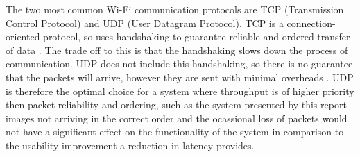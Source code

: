 The two most common Wi-Fi communication protocols are TCP (Transmission Control Protocol) and UDP (User Datagram Protocol). TCP is a connection-oriented protocol, so uses handshaking to guarantee reliable and ordered transfer of data \cite{fall2011tcp}. The trade off to this is that the handshaking slows down the process of communication. UDP does not include this handshaking, so there is no guarantee that the packets will arrive, however they are sent with minimal overheads \cite{postel1980user}. UDP is therefore the optimal choice for a system where throughput is of higher priority then packet reliability and ordering, such as the system presented by this report- images not arriving in the correct order and the ocassional loss of packets would not have a significant effect on the functionality of the system in comparison to the usability improvement a reduction in latency provides.